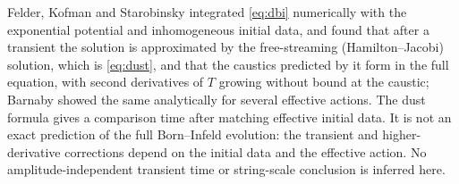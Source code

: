  Felder, Kofman and Starobinsky \cite{FKS02} integrated \eqref{eq:dbi} numerically with the exponential potential and inhomogeneous initial data, and found that after a transient the solution is approximated by the free-streaming (Hamilton--Jacobi) solution, which is \eqref{eq:dust}, and that the caustics predicted by it form in the full equation, with second derivatives of $T$ growing without bound at the caustic; Barnaby \cite{Barnaby04} showed the same analytically for several effective actions. The dust formula gives a comparison time after matching effective initial data. It is not an exact prediction of the full Born--Infeld evolution: the transient and higher-derivative corrections depend on the initial data and the effective action. No amplitude-independent transient time or string-scale conclusion is inferred here.
